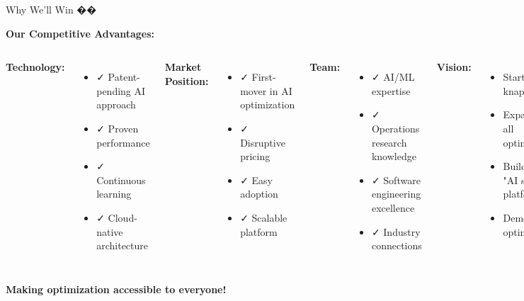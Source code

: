 \documentclass[aspectratio=169]{beamer}
\begin{document}
\begin{frame}{Why We'll Win ��}
\begin{center}
\textbf{Our Competitive Advantages:}
\end{center}

\vspace{0.5cm}

\begin{columns}
\textbf{Technology:}
\begin{itemize}
    \item ✓ Patent-pending AI approach
    \item ✓ Proven performance
    \item ✓ Continuous learning
    \item ✓ Cloud-native architecture
\end{itemize}

\vspace{0.3cm}
\textbf{Market Position:}
\begin{itemize}
    \item ✓ First-mover in AI optimization
    \item ✓ Disruptive pricing
    \item ✓ Easy adoption
    \item ✓ Scalable platform
\end{itemize}

\textbf{Team:}
\begin{itemize}
    \item ✓ AI/ML expertise
    \item ✓ Operations research knowledge
    \item ✓ Software engineering excellence
    \item ✓ Industry connections
\end{itemize}

\vspace{0.3cm}
\textbf{Vision:}
\begin{itemize}
    \item Start with knapsack
    \item Expand to all optimization
    \item Build the "AI solver platform"
    \item Democratize optimization
\end{itemize}
\end{columns}

\vspace{0.5cm}
\begin{center}
\large \textcolor{aigreen}{\textbf{Making optimization accessible to everyone!}}
\end{center}
\end{frame}
\end{document}
